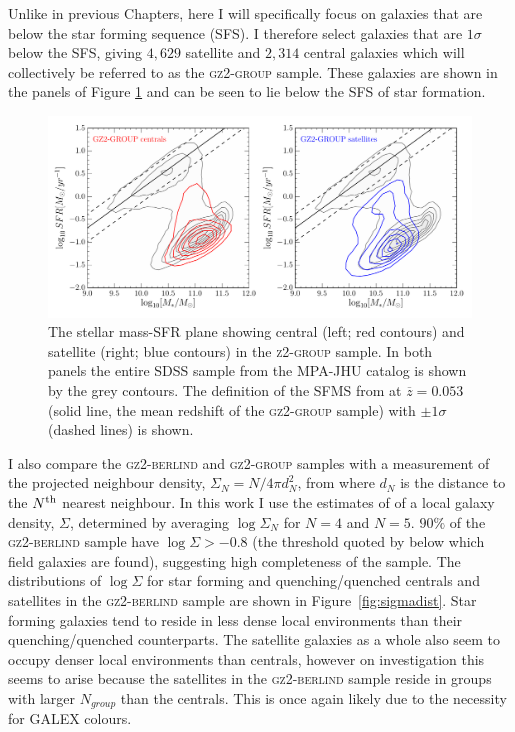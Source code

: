 Unlike in previous Chapters, here I will specifically focus on galaxies that are below the star forming sequence (SFS). I therefore select galaxies that are $1\sigma$ below the SFS, giving $4,629$ satellite and $2,314$ central galaxies which will collectively be referred to as the \textsc{gz2-group} sample. These galaxies are shown in the panels of Figure \ref{fig:sfrmass} and can be seen to lie below the SFS of star formation. 

\begin{figure}
\centering
\includegraphics[width=\textwidth]{environment/sfr_mass_quenched_centrals_satellites_gz2_group.pdf}
\caption[Stellar mass-SFR plane for the centrals and satellites of the \textsc{z2-group} sample]{The stellar mass-SFR plane showing central (left; red contours) and satellite (right; blue contours) in the \textsc{z2-group} sample. In both panels the entire SDSS sample from the MPA-JHU catalog is shown by the grey contours. The definition of the SFMS from \cite{peng10} at $\overline{z} = 0.053$ (solid line, the mean redshift of the \textsc{gz2-group} sample) with $\pm1\sigma$ (dashed lines) is shown.}
\label{fig:sfrmass}
\end{figure}


I also compare the \textsc{gz2-berlind} and \textsc{gz2-group} samples with a measurement of the projected neighbour density, $\Sigma_N = N/4\pi d_N^2$, from \cite{Baldry06} where $d_N$ is the distance to the $N^{\rm{th}}$ nearest neighbour. In this work I use the estimates of \cite{bamford09} of a local galaxy density, $\Sigma$, determined by averaging $\log\Sigma_N$ for $N = 4$ and $N=5$. $90\%$ of the \textsc{gz2-berlind} sample have $\log\Sigma > -0.8$ (the threshold quoted by \citealt{Baldry06} below which field galaxies are found), suggesting high completeness of the sample. The distributions of $\log\Sigma$ for star forming and quenching/quenched centrals and satellites in the \textsc{gz2-berlind} sample are shown in Figure~\ref{fig:sigmadist}. Star forming galaxies tend to reside in less dense local environments than their quenching/quenched counterparts. The satellite galaxies as a whole also seem to occupy denser local environments than centrals, however on investigation this seems to arise because the satellites in the \textsc{gz2-berlind} sample reside in groups with larger $N_{group}$ than the centrals. This is once again likely due to the necessity for GALEX colours. 

